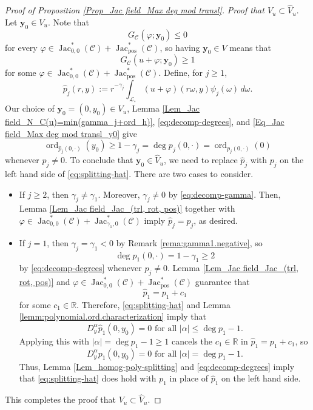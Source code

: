 \documentclass[11pt, letterpaper, reqno]{amsart}
\numberwithin{equation}{section}
\theoremstyle{remark}
\newcommand{\RR}{\mathbb{R}}
\newcommand{\cC}{\mathcal{C}}
\newcommand{\cL}{\mathcal{L}}
\newcommand{\mbfy}{\mathbf{y}}
\newcommand{\Jac}{\operatorname{Jac}}
\newcommand{\Ord}{\operatorname{ord}}
\begin{document}
\begin{proof}[Proof of Proposition \ref{Prop_Jac field_Max deg mod transl}]
      \textit{Proof that $V_u \subset \hat V_u$}. Let $\mbfy_0 \in V_u$. Note that 
      \[ G_\cC(\varphi; \mbfy_0) \leq 0 
      \]
      for every $\varphi \in \Jac^*_{0,0}(\cC) + \Jac^*_\textrm{pos}(\cC)$, so having $\mbfy_0 \in V$ means that 
      \begin{equation}\label{Eq_Jac field_Max deg mod transl_y0}
      G_\cC(u + \varphi; \mbfy_0) \geq 1
      \end{equation}
      for some $\varphi \in \Jac^*_{0,0}(\cC) + \Jac^*_\textrm{pos}(\cC)$.
      Define, for $j \geq 1$,
      \[
      \hat p_j(r,y) := r^{-\gamma_j} \int_{\cL_\circ}(u+\varphi)(r\omega,y)\psi_j(\omega)\, d\omega.
      \]
      Our choice of $\mbfy_0 = (0, y_0) \in V_u$, Lemma \ref{Lem_Jac field_N_C(u)=min(gamma_j+ord_h)}, \eqref{eq:decomp-degrees}, and \eqref{Eq_Jac field_Max deg mod transl_y0} give
      \begin{equation} \label{eq:splitting-hat}
      \Ord_{\hat p_j(0,\cdot)}(y_0) \geq 1 - \gamma_j  = \deg p_j(0, \cdot) = \Ord_{p_j(0,\cdot)}(0) 
      \end{equation}
      whenever $p_j \neq 0$. To conclude that $\mbfy_0 \in \hat V_u$, we need to replace $\hat p_j$ with $p_j$ on the left hand side of \eqref{eq:splitting-hat}. There are two cases to consider. 
      \begin{itemize}
      	\item If $j \geq 2$, then $\gamma_j \neq \gamma_1$. Moreover, $\gamma_j \neq 0$ by \eqref{eq:decomp-gamma}. Then, Lemma \ref{Lem_Jac field_Jac_(trl, rot, pos)} together with $\varphi \in \Jac^*_{0,0}(\cC) + \Jac^*_{\gamma_1,0}(\cC)$ imply $\hat p_j = p_j$, as desired.
      	\item If $j = 1$, then $\gamma_j=\gamma_1 <0$ by Remark \ref{rema:gamma1.negative}, so
       \[ \deg p_1(0, \cdot) = 1-\gamma_1 \geq 2 \]
       by \eqref{eq:decomp-degrees} whenever $p_j \neq 0$. Lemma \ref{Lem_Jac field_Jac_(trl, rot, pos)} and $\varphi \in \Jac^*_{0,0}(\cC) + \Jac^*_\textrm{pos}(\cC)$ guarantee that
       \[ \hat p_1 = p_1 + c_1 \]
       for some $c_1 \in \RR$. Therefore, \eqref{eq:splitting-hat} and Lemma \ref{lemm:polynomial.ord.characterization} imply that
       \[ D_y^\alpha \hat p_1(0, y_0) = 0 \text{ for all } |\alpha| \leq \deg p_1 - 1. \]
       Applying this with $|\alpha| = \deg p_1 - 1 \geq 1$ cancels the $c_1 \in \RR$ in $\hat p_1 = p_1 + c_1$, so
       \[ D_y^\alpha p_1(0, y_0) = 0 \text{ for all } |\alpha| = \deg p_1 - 1. \]
       Thus, Lemma \ref{Lem_homog-poly-splitting} and \eqref{eq:decomp-degrees} imply that \eqref{eq:splitting-hat} does hold with $p_1$ in place of $\hat p_1$ on the left hand side.
      \end{itemize}
      This completes the proof that $V_u \subset \hat V_u$.
      

\end{proof}
\end{document}
